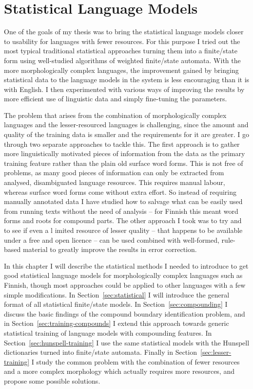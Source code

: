 \documentclass[officiallayout,final]{unihelcompling}
\begin{document}
\chapter{Statistical Language Models}
\label{chap:statistical-models}

One of the goals of my thesis was to bring the statistical \glspl{language
model} closer to usability for  languages with fewer resources. For this
purpose I tried out the most typical traditional statistical approaches turning
them into a finite\-/state form using well-studied algorithms of weighted
finite\-/state automata. With the more morphologically complex languages, the
improvement gained by bringing statistical data to the language models in the
system is less encouraging than it is with English. I then experimented with
various ways of improving the results by more efficient use of linguistic data
and simply fine-tuning the parameters.

The problem that arises from the combination of morphologically complex
languages and the lesser-resourced languages is challenging, since the amount
and quality of the training data is smaller and the requirements for it are
greater. I go through two separate approaches to tackle this. The first
approach is to gather more linguistically motivated pieces of information from
the data as the primary training feature rather than the plain old surface word
forms. This is not free of problems, as many good pieces of information can
only be extracted from analysed, disambiguated language resources.  This
requires manual labour, whereas surface word forms come without extra effort.
So instead of requiring manually annotated data I have studied how to salvage
what can be easily used from running texts without the need of analysis -- for
Finnish this meant word forms and roots for compound parts. The other approach
I took was to try and to see if even a l imited resource of lesser quality --
that happens to be available under a free and open licence -- can be used
combined with well-formed, rule-based material to greatly improve the results
in error correction.

In this chapter I will describe the statistical methods I needed to introduce
to get good statistical language models for morphologically complex languages
such as Finnish, though most approaches could be applied to other languages
with a few simple modifications. In Section~\ref{sec:statistical} I will
introduce the general format of all statistical finite\-/state models.  In
Section~\ref{sec:compounding} I discuss the basic findings of the compound
boundary identification problem, and in Section~\ref{sec:training-compounds} I
extend this approach towards generic statistical training of language models
with compounding features. In Section~\ref{sec:hunspell-training} I use the
same statistical models with the Hunspell dictionaries turned into
finite\-/state automata. Finally in Section~\ref{sec:lesser-training} I study
the common problem with the combination of fewer resources and a more complex
morphology which actually requires more resources, and propose some possible
solutions.
\end{document}
